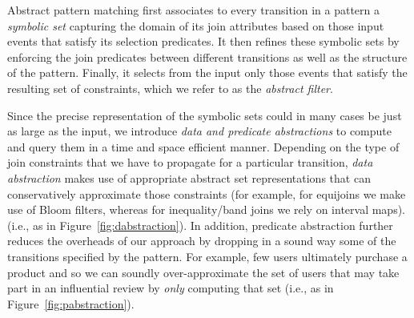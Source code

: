 Abstract pattern matching first associates to every transition in a pattern a
{\em symbolic set} capturing the domain of its join attributes based on those
input events that satisfy its selection predicates.  It then refines these
symbolic sets by enforcing the join predicates
between different transitions as well as the structure of the pattern.
Finally, it selects from the input only those events that satisfy the resulting
set of constraints, which we refer to as the {\em abstract filter}.

Since the precise representation of the symbolic sets could in many cases be
just as large as the input, we introduce {\em data and predicate abstractions}
to compute and query them in a time and space efficient manner.  Depending on
the type of join constraints that we have to propagate for a particular
transition, {\em data abstraction} makes use of appropriate abstract set
representations that can conservatively approximate those constraints (for
example, for equijoins we make use of Bloom filters\cite{Bloom:1970}, whereas
for inequality/band joins we rely on interval maps).  (i.e., as in
Figure~\ref{fig:dabstraction}).  In addition, predicate abstraction further
reduces the overheads of our approach by dropping in a sound way some of the
transitions specified by the pattern.  For example, few users ultimately purchase
a product and so we can soundly over-approximate the set of users that may take
part in an influential review by \emph{only} computing that set (i.e., as in
Figure~\ref{fig:pabstraction}).

